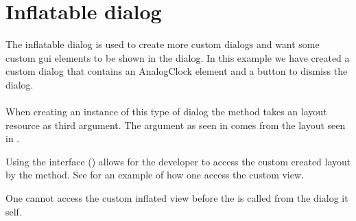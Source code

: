 \section{Inflatable dialog}
\label{sec:impl_inflatable_dialog}

The inflatable dialog is used to create more custom dialogs and want some custom gui elements to be shown in the dialog. In this example we have created a custom dialog that contains an AnalogClock element and a button to dismiss the dialog.
\\\\
When creating an instance of this type of dialog the  method takes an layout resource as third argument. The argument  as seen in  comes from the layout seen in .



\noindent
Using the  interface () allows for the developer to access the custom created layout by the  method. See  for an example of how one access the custom view. 

\begin{note}
    One cannot access the custom inflated view before the  is called from the dialog it self.
\end{note}


